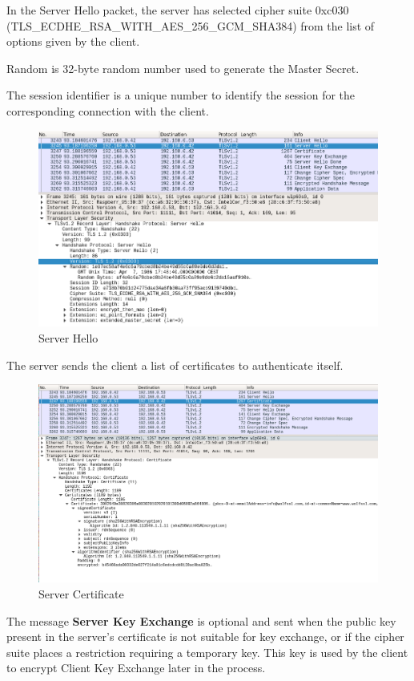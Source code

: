 \documentclass[a4paper,12pt]{article}
\begin{document}
In the Server Hello packet, the server has selected cipher suite 0xc030 (TLS\_ECDHE\_RSA\_WITH\_AES\_256\_GCM\_SHA384) from the list of options given by the client.

Random is 32-byte random number used to generate the Master Secret.

The session identifier is a unique number to identify the session for the corresponding connection with the client.

\begin{figure}[H]
    \centering
    \includegraphics[scale=0.500]{./code/img/server-hello.png}
    \caption{Server Hello}
    
\end{figure}
The server sends the client a list of certificates to authenticate itself.
\begin{figure}[H]
    \centering
    \includegraphics[scale=0.400]{./code/img/server-certificate.png}
    \caption{Server Certificate}
    
\end{figure}
The message \textbf{Server Key Exchange} is optional and sent when the public key present in the server's certificate is not suitable for key exchange, or if the cipher suite places a restriction requiring a temporary key. This key is used by the client to encrypt Client Key Exchange later in the process.
\end{document}
